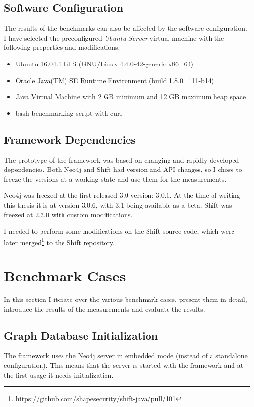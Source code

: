 \subsection{Software Configuration}
The results of the benchmarks can also be affected by the software configuration. I have selected the preconfigured \emph{Ubuntu Server} virtual machine with the following properties and modifications:

\begin{itemize}[topsep=0pt]
  \item Ubuntu 16.04.1 LTS (GNU/Linux 4.4.0-42-generic x86\_64)
  \item Oracle Java(TM) SE Runtime Environment (build 1.8.0\_111-b14)
  \item Java Virtual Machine with 2 GB minimum and 12 GB maximum heap space
  \item bash benchmarking script with curl
\end{itemize}

\subsection{Framework Dependencies}
The prototype of the framework was based on changing and rapidly developed dependencies. Both Neo4j and Shift had version and API changes, so I chose to freeze the versions at a working state and use them for the measurements.

Neo4j was freezed at the first released 3.0 version: 3.0.0. At the time of writing this thesis it is at version 3.0.6, with 3.1 being available as a beta. Shift was freezed at 2.2.0 with custom modifications.

I needed to perform some modifications on the Shift source code, which were later merged\footnote{\small\url{https://github.com/shapesecurity/shift-java/pull/101}} to the Shift repository.


\section{Benchmark Cases}
In this section I iterate over the various benchmark cases, present them in detail, introduce the results of the measurements and evaluate the results.

\subsection{Graph Database Initialization}
The framework uses the Neo4j server in embedded mode (instead of a standalone configuration). This means that the server is started with the framework and at the first usage it needs initialization.

